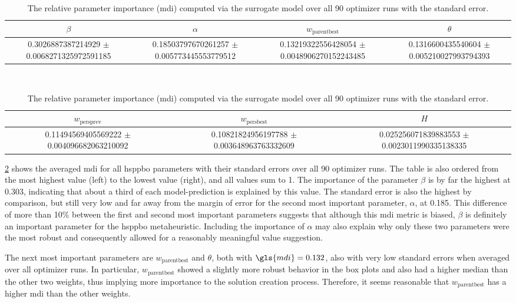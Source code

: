 \begin{table}[!ht]
	\centering
	\caption[Relative parameter importance over all 90 optimizer runs]{The relative parameter importance (\gls{mdi}) computed via the surrogate model over all 90 optimizer runs with the standard error. }
	\label{tab:parameter_importance}
	\begin{tabular}{cccc}
		\hline
		$\beta$ & $\alpha$ & $w_{\text{parentbest}}$ & $\theta$ \\ \hline
		  \num{0.3026887387214929} $\pm$ \num{0.0068271325972591185} & 
		  \num{0.18503797670261257} $\pm$ \num{0.005773445553779512} & 
		  \num{0.13219322556428054} $\pm$ \num{0.0048906270152243485} & 
		  \num{0.1316600435540604} $\pm$ \num{0.005210027993794393} \\ \hline
	\end{tabular}
	\bigskip\\
	\begin{tabular}{ccc}
		\hline
		$w_{\text{persprev}}$ & $w_{\text{persbest}}$ & $H$ \\ \hline
		\num{0.11494569405569222} $\pm$ \num{0.004096682063210092} & 
		\num{0.10821824956197788} $\pm$ \num{0.003648963763332609} & 
		\num{0.025256071839883553} $\pm$ \num{0.0023011990335138335} \\ \hline
	\end{tabular}
\end{table}


\cref{tab:parameter_importance} shows the averaged \gls{mdi} for all \gls{hsppbo} parameters with their standard errors over all 90 optimizer runs. The table is also ordered from the most highest value (left) to the lowest value (right), and all values sum to 1. The importance of the parameter $\beta$ is by far the highest at 0.303, indicating that about a third of each model-prediction is explained by this value. The standard error is also the highest by comparison, but still very low and far away from the margin of error for the second most important parameter, $\alpha$, at 0.185. This difference of more than 10\% between the first and second most important parameters suggests that although this \gls{mdi} metric is biased, $\beta$ is definitely an important parameter for the \gls{hsppbo} metaheuristic. Including the importance of $\alpha$ may also explain why only these two parameters were the most robust and consequently allowed for a reasonably meaningful value suggestion.

The next most important parameters are $w_{\text{parentbest}}$ and $\theta$, both with $\gls{mdi} = 0.132$, also with very low standard errors when averaged over all optimizer runs. In particular, $w_{\text{parentbest}}$ showed a slightly more robust behavior in the box plots and also had a higher median than the other two weights, thus implying more importance to the solution creation process. Therefore, it seems reasonable that $w_{\text{parentbest}}$ has a higher \gls{mdi} than the other weights.

